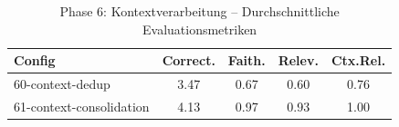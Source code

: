\begin{table}[H]
\centering
\small
\begin{tabular}{lcccc}
\toprule
Config & Correct. & Faith. & Relev. & Ctx.Rel. \\
\midrule
60-context-dedup & 3.47 & 0.67 & 0.60 & 0.76 \\
61-context-consolidation & 4.13 & 0.97 & 0.93 & 1.00 \\
\bottomrule
\end{tabular}
\caption{Phase 6: Kontextverarbeitung -- Durchschnittliche Evaluationsmetriken}
\label{tab:phase6_eval}
\end{table}